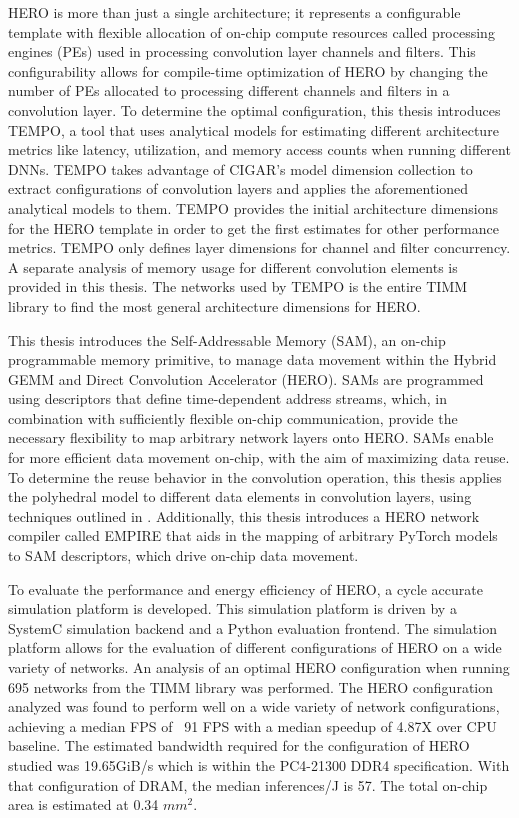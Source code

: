 HERO is more than just a single architecture; it represents a configurable
template with flexible allocation of on-chip compute resources called processing
engines (PEs) used in processing convolution layer channels and filters. This
configurability allows for compile-time optimization of HERO by changing the
number of PEs allocated to processing different channels and filters in a
convolution layer. To determine the optimal configuration, this thesis
introduces TEMPO, a tool that uses analytical models for estimating different
architecture metrics like latency, utilization, and memory access counts when
running different DNNs. TEMPO takes advantage of CIGAR's model dimension
collection to extract configurations of convolution layers and applies the
aforementioned analytical models to them. TEMPO provides the initial
architecture dimensions for the HERO template in order to get the first
estimates for other performance metrics. TEMPO only defines layer dimensions for
channel and filter concurrency. A separate analysis of memory usage for
different convolution elements is provided in this thesis. The networks  used by
TEMPO is the entire TIMM library to find the most general architecture
dimensions for HERO.


This thesis introduces the Self-Addressable Memory (SAM), an on-chip
programmable memory primitive, to manage data movement within the Hybrid GEMM
and Direct Convolution Accelerator (HERO). SAMs are programmed using descriptors
that define time-dependent address streams, which, in combination with
sufficiently flexible on-chip communication, provide the necessary flexibility
to map arbitrary network layers onto HERO. SAMs enable for more efficient data
movement on-chip, with the aim of maximizing data reuse. To determine the reuse
behavior in the convolution operation, this thesis applies the polyhedral model
to different data elements in convolution layers, using techniques outlined in
\cite{meeus}. Additionally, this thesis introduces a HERO network compiler
called EMPIRE that aids in the mapping of arbitrary PyTorch models to SAM
descriptors, which drive on-chip data movement.


To evaluate the performance and energy efficiency of HERO, a cycle accurate
simulation platform is developed. This simulation platform is driven by a
SystemC simulation backend and a Python evaluation frontend. The simulation
platform allows for the evaluation of different configurations of HERO on a wide
variety of networks. An analysis of an optimal HERO configuration when running
695 networks from the TIMM library was performed. The HERO configuration
analyzed was found to perform well on a wide variety of network configurations,
achieving a median FPS of ~91 FPS with a median speedup of 4.87X over CPU
baseline. The estimated bandwidth required for the configuration of HERO studied
was 19.65GiB/s which is within the PC4-21300 DDR4 specification. With that
configuration of DRAM, the median inferences/J is 57. The total on-chip area is
estimated at 0.34 $mm^2$.

